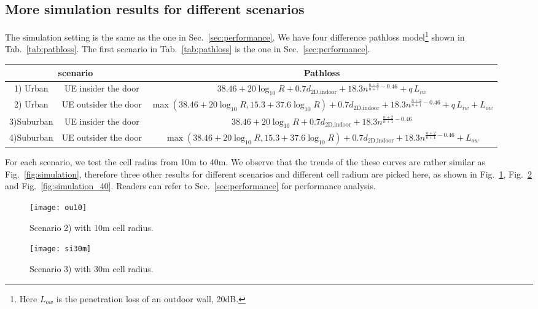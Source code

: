 \documentclass[conference]{IEEEtran}
\begin{document}
\subsection{More simulation results for different scenarios}
The simulation setting is the same as the one in Sec.~\ref{sec:performance}. We have four difference pathloss model\footnote{Here $L_{ow}$ is the penetration loss of an outdoor wall, 20dB.}  shown in Tab.~\ref{tab:pathloss}. The first scenario in Tab.~\ref{tab:pathloss} is the one in Sec.~\ref{sec:performance}.
\begin{table*}[htb]
\centering
\begin{tabular}{|c|c|c|}
\hline
 \multicolumn{2}{|c|}{scenario}& Pathloss\\
\hline
1) Urban & UE insider the door& $\!38.46\!+\!20\log_{10}R\!+\!0.7d_\text{2D,indoor}\!+\!18.3n^{\frac{n+2}{n+1}\!-\!0.46}+q\,L_{iw}$\\
\hline
2) Urban & UE outsider the door& $\max\left(38.46+20\log_{10}R, 15.3+37.6\log_{10}R\right)+\!0.7d_\text{2D,indoor}\!+\!18.3n^{\frac{n+2}{n+1}\!-\!0.46}+q\,L_{iw}+L_{ow}$\\
\hline
3)Suburban&  UE insider the door& $38.46\!+\!20\log_{10}R\!+\!0.7d_\text{2D,indoor}\!+\!18.3n^{\frac{n+2}{n+1}\!-\!0.46}$\\
\hline
4)Suburban&  UE outsider the door& $\max\left(38.46+20\log_{10}R, 15.3+37.6\log_{10}R\right)+\!0.7d_\text{2D,indoor}\!+\!18.3n^{\frac{n+2}{n+1}\!-\!0.46}+L_{ow}$\\
\hline
\end{tabular}
\caption{Pathloss model for different indoor small cell scenario}
\label{tab:pathloss}
\end{table*}

For each scenario, we test the cell radius from 10m to 40m. We observe that the trends of the these curves are rather similar as Fig.~\ref{fig:simulation}, therefore three other results for different scenarios and different cell radium are picked here, as shown  in Fig.~\ref{fig:simulation_10}, Fig.~\ref{fig:simulation_30} and Fig.~\ref{fig:simulation_40}. Readers can refer to Sec.~\ref{sec:performance} for performance analysis.

\begin{figure}[htb]
\centering
\texttt{[image: ou10]}
\caption{Scenario 2) with 10m cell radius.}
\label{fig:simulation_10}
\end{figure}

\begin{figure}[htb]
\centering
\texttt{[image: si30m]}
\caption{Scenario 3) with 30m cell radius.}
\label{fig:simulation_30}
\end{figure}
\end{document}
